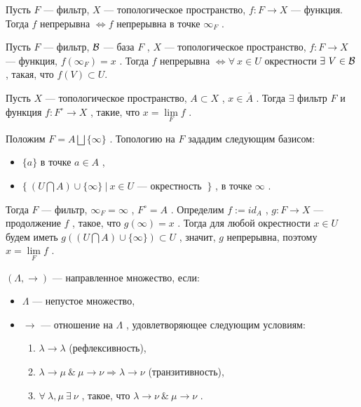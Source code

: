 \SSsect Пусть \( F \) --- фильтр, \( X \) --- топологическое пространство, \( f: F \rightarrow X \) --- функция. Тогда \( f \) непрерывна \( \Leftrightarrow f \) непрерывна в точке \( \infty_F \) .

\SSsect Пусть \( F \) --- фильтр, \( \mathcal{B} \) --- база \( F \) , \( X \) --- топологическое пространство, \( f: F \rightarrow X \) --- функция, \( f(\infty_F)=x \) . Тогда \( f \) непрерывна \( \Leftrightarrow \forall~x \in U \) окрестности \( \exists~V \in \mathcal{B} \) , такая, что \( f(V) \subset U \).

\SSsect[!] Пусть \( X \) --- топологическое пространство, \( A \subset X \) , \( x \in \overline{A} \) . Тогда \( \exists \) фильтр \( F \) и функция \( f: F^\circ \rightarrow X \) , такие, что \( x = \lim\limits_{F} f \) .

\SSproof

Положим \( F = A \bigsqcup \{\infty\} \) . Топологию на \( F \) зададим следующим базисом:
\begin{itemize}[label=]
\item \( \{a\} \) в точке \( a \in A \) ,
\item \( \{~( U \bigcap A ) \cup \{\infty\} ~|~ x \in U \) --- окрестность \( ~\} \) , в точке \( \infty \) .
\end{itemize}

Тогда \( F \) --- фильтр, \( \infty_F=\infty \) , \( F^\circ=A \) . Определим \( f:=id_A \) , \( g: F \rightarrow X \) --- продолжение \( f \) , такое, что \( g(\infty)=x \) . Тогда для любой окрестности \( x \in U \) будем иметь \( g(( U \bigcap A ) \cup \{\infty\}) \subset U \) , значит, \( g \) непрерывна, поэтому \( x = \lim\limits_{F} f \) .

\SSendp

\pagebreak

\SSsect[def] \( (\Lambda,\rightarrow) \) --- направленное множество, если:
\begin{itemize}[label=]
\item \( \Lambda \) --- непустое множество,   
\item \( \rightarrow \) --- отношение на \( \Lambda \) , удовлетворяющее следующим условиям:
\begin{enumerate}[label={\alph*)}]
\item \( \lambda \rightarrow \lambda \) (рефлексивность),
\item \( \lambda \rightarrow \mu ~\&~ \mu \rightarrow \nu \Rightarrow \lambda \rightarrow \nu \) (транзитивность),
\item \( \forall~\lambda,\mu ~\exists~ \nu \) , такое, что \( \lambda \rightarrow \nu ~\&~ \mu \rightarrow \nu \) .
\end{enumerate}
\end{itemize}

